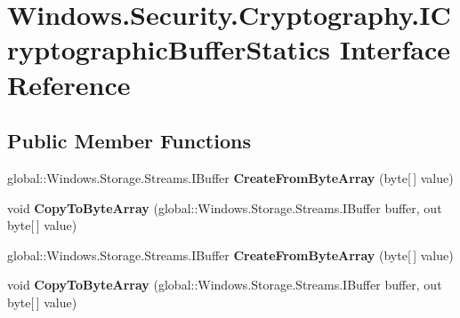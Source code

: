 \hypertarget{interface_windows_1_1_security_1_1_cryptography_1_1_i_cryptographic_buffer_statics}{}\section{Windows.\+Security.\+Cryptography.\+I\+Cryptographic\+Buffer\+Statics Interface Reference}
\label{interface_windows_1_1_security_1_1_cryptography_1_1_i_cryptographic_buffer_statics}
\subsection*{Public Member Functions}
\begin{DoxyCompactItemize}
\item 
\mbox{\label{interface_windows_1_1_security_1_1_cryptography_1_1_i_cryptographic_buffer_statics_ae1db9a5ea426f69de9bce3add19b97f7}} 
global\+::\+Windows.\+Storage.\+Streams.\+I\+Buffer {\bfseries Create\+From\+Byte\+Array} (byte\mbox{[}$\,$\mbox{]} value)
\item 
\mbox{\label{interface_windows_1_1_security_1_1_cryptography_1_1_i_cryptographic_buffer_statics_af4c54874a2a48fcead29f0fe1352cec5}} 
void {\bfseries Copy\+To\+Byte\+Array} (global\+::\+Windows.\+Storage.\+Streams.\+I\+Buffer buffer, out byte\mbox{[}$\,$\mbox{]} value)
\item 
\mbox{\label{interface_windows_1_1_security_1_1_cryptography_1_1_i_cryptographic_buffer_statics_ae1db9a5ea426f69de9bce3add19b97f7}} 
global\+::\+Windows.\+Storage.\+Streams.\+I\+Buffer {\bfseries Create\+From\+Byte\+Array} (byte\mbox{[}$\,$\mbox{]} value)
\item 
\mbox{\label{interface_windows_1_1_security_1_1_cryptography_1_1_i_cryptographic_buffer_statics_af4c54874a2a48fcead29f0fe1352cec5}} 
void {\bfseries Copy\+To\+Byte\+Array} (global\+::\+Windows.\+Storage.\+Streams.\+I\+Buffer buffer, out byte\mbox{[}$\,$\mbox{]} value)

\end{DoxyCompactItemize}
